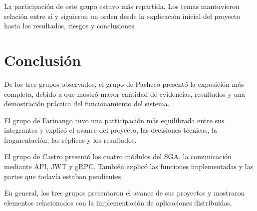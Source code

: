 \documentclass[12pt]{article}
\begin{document}
La participación de este grupo estuvo más repartida. Los temas mantuvieron relación entre sí y siguieron un orden desde la explicación inicial del proyecto hasta los resultados, riesgos y conclusiones.

\section*{Conclusión}

De los tres grupos observados, el grupo de Pacheco presentó la exposición más completa, debido a que mostró mayor cantidad de evidencias, resultados y una demostración práctica del funcionamiento del sistema.

El grupo de Farinango tuvo una participación más equilibrada entre sus integrantes y explicó el avance del proyecto, las decisiones técnicas, la fragmentación, las réplicas y los resultados.

El grupo de Castro presentó los cuatro módulos del SGA, la comunicación mediante API, JWT y gRPC. También explicó las funciones implementadas y las partes que todavía estaban pendientes.

En general, los tres grupos presentaron el avance de sus proyectos y mostraron elementos relacionados con la implementación de aplicaciones distribuidas.
\end{document}
